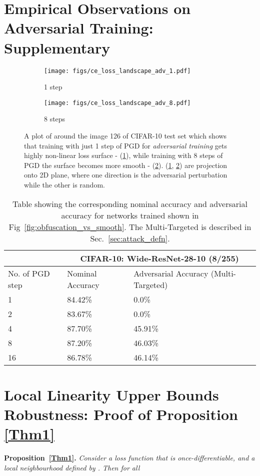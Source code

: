 \documentclass{article}
\theoremstyle{plain}
\theoremstyle{definition}
\theoremstyle{remark}
\begin{document}
\section{Empirical Observations on Adversarial Training: Supplementary}
\begin{figure}[htb]
    \centering
    \begin{subfigure}[t]{0.45\textwidth}
    \centering
    \texttt{[image: figs/ce\_loss\_landscape\_adv\_1.pdf]}\caption{1 step}\label{subfig:obfs_landscape}
    \end{subfigure}
    \begin{subfigure}[t]{0.45\textwidth}
    \texttt{[image: figs/ce\_loss\_landscape\_adv\_8.pdf]}
    \caption{8 steps}\label{subfig:not_obfs_landscape}
    \end{subfigure}
    \caption{A plot of  around the image 126 of CIFAR-10 test set which shows that training with just 1 step of PGD for {\it adversarial training} gets highly non-linear loss surface - (\ref{subfig:obfs_landscape}), while training with 8 steps of PGD the surface becomes more smooth - (\ref{subfig:not_obfs_landscape}). (\ref{subfig:obfs_landscape}, \ref{subfig:not_obfs_landscape}) are  projection onto 2D plane, where one direction is the adversarial perturbation while the other is random.}
    \label{fig:loss_landscape_18}
\end{figure}
\begin{table}[htb]
\centering
\begin{tabular}{ p{3.0cm}||p{2.7cm}|p{3.3cm}}
 &\multicolumn{2}{c}{{\bf\textcolor{Mahogany}{CIFAR-10: Wide-ResNet-28-10 (8/255)}}} \\
 \hline
No. of PGD step&  Nominal Accuracy & Adversarial Accuracy (Multi-Targeted)\\
 \hline
1 & 84.42\%& 0.0\%  \\
2 & 83.67\% & 0.0\%  \\
4 & 87.70\%& 45.91\%  \\
8 & 87.20\%& 46.03\%  \\
16 & 86.78\% & 46.14\%  \\
\end{tabular}
\caption{Table showing the corresponding nominal accuracy and adversarial accuracy for networks trained shown in Fig~\ref{fig:obfuscation_vs_smooth}. The Multi-Targeted is described in Sec.~\ref{sec:attack_defn}.}\label{tab:1248_acc}
\end{table}
\section{Local Linearity Upper Bounds Robustness: Proof of Proposition \ref{Thm1}}\label{app:proof}
{\bf Proposition~\ref{Thm1}. }
 {\it  Consider a loss function  that is once-differentiable, and a local neighbourhood defined by . Then for all  }
\end{document}

